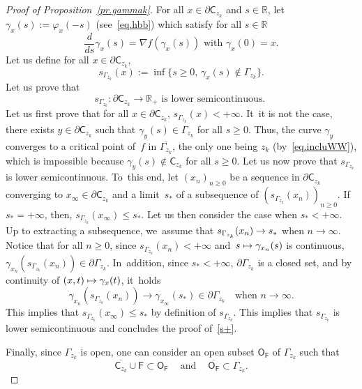 \documentclass[10pt]{amsart}
\newcommand\mto{\mathchoice{\longmapsto}{\mapsto}{\mapsto}{\mapsto}}
\newcommand{\quand}{\quad\text{and}\quad}
\let\pa\partial
\theoremstyle{plain}
\theoremstyle{definition}
\begin{document}
\begin{proof}[Proof of Proposition~\ref{pr.gammak}]
For all $x\in \pa \mathsf C_{z_k}$ and $s\in \mathbb R$, let $\gamma_x(s):=\varphi_x(-s)$ (see~\eqref{eq.hbb}) which satisfy for all $s\in \mathbb R$
\begin{equation}\label{eq.hbb2}
\frac{d}{ds}\gamma_x(s)=\nabla f(\gamma_x(s)) \text{ with } \gamma_x(0)=x.
\end{equation}
Let us define
for all $x\in \pa \mathsf C_{z_k}$,
\begin{equation}\label{eq.des+}
s_{\Gamma_{z_k}}(x):=\inf\{s\ge 0, \, \gamma_x(s) \notin {\Gamma_{z_k}} \}.
\end{equation}
Let us prove that
\begin{equation}\label{s+}
s_{\Gamma_{z_k}}: \pa \mathsf C_{z_k}\to \mathbb R_+ \text{ is lower semicontinuous. }
\end{equation}
Let us first prove that for all $x\in \pa \mathsf C_{z_k}$, $ s_{\Gamma_{z_k}}(x)<+\infty$. It~it is not the case, there exists $y\in \pa \mathsf C_{z_k}$ such that $\gamma_y(s)\in \Gamma_{z_k}$ for all $s\ge 0$. Thus, the curve $\gamma_y$ converges to a critical point of~$f$ in $\overline{\Gamma_{z_k}}$, the only one being $z_k$ (by~\eqref{eq.incluWW}), which is impossible because $\gamma_y(s)\notin \mathsf C_{z_k}$ for all $s\ge 0$. Let us now prove that $ s_{\Gamma_{z_k}}$ is lower semicontinuous. To~this end, let $(x_n)_{n\ge 0}$ be a sequence in $ \pa { \mathsf C_{z_k}}$ converging to $x_{\infty}\in \pa { \mathsf C_{z_k}}$ and a limit~$s_*$ of a subsequence of $(s_{\Gamma_{z_k}}(x_n))_{n\ge 0}$. If~$s_*=+\infty$, then, $ s_{\Gamma_{z_k}}(x_{\infty})\le s_*$. Let us then consider the case when $s_*<+\infty$. Up to extracting a subsequence, we~assume that $ s_{\Gamma_{z_k}}(x_n)\to\nobreak s_*$ when $n\to \infty$. Notice that for all $n\ge 0$, since $ s_{\Gamma_{z_k}}(x_n)<+\infty$ and~$s\mto \gamma_{x_n}(s)$ is continuous,
$\gamma_{x_n}(s_{\Gamma_{z_k}}(x_n))\in \pa \Gamma_{z_k}$. In~addition, since $s_*<+\infty$,
$\pa \Gamma_{z_k}$ is a closed set, and by continuity of $(x,t)\mto \gamma_x(t)$, it~holds
\[
\gamma_{x_n}(s_{\Gamma_{z_k}}(x_n))\to \gamma_{x_{\infty}}(s_*)\in \pa \Gamma_{z_k}\quad \text{when }n\to \infty.
\]
This implies that $ s_{\Gamma_{z_k}}(x_{\infty})\le s_*$ by definition of $ s_{\Gamma_{z_k}}$. This implies that $ s_{\Gamma_{z_k}}$ is lower semicontinuous and concludes the proof of~\eqref{s+}.

Finally, since $\Gamma_{z_k}$ is open, one can consider an open subset $\mathsf O_{\mathsf F}$ of $\Gamma_{z_k}$ such that
\[
\overline{ \mathsf C_{z_k} }\cup \mathsf F\subset \mathsf O_{\mathsf F} \ \quand \ \overline{\mathsf O_{\mathsf F}}\subset \Gamma_{z_k}.
\]

\end{proof}
\end{document}
